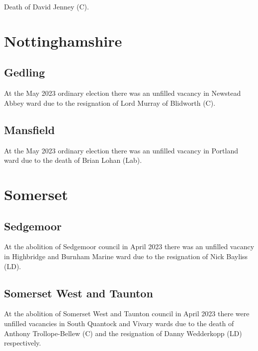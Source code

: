 \documentclass[a4paper,openany]{book}
\begin{document}
\begin{resultsiii}

Death of David Jenney (C).

\section{Nottinghamshire}

\subsection*{Gedling}

At the May 2023 ordinary election there was an unfilled vacancy in Newstead Abbey ward due to the resignation of Lord Murray of Blidworth (C).%

\subsection*{Mansfield}

At the May 2023 ordinary election there was an unfilled vacancy in Portland ward due to the death of Brian Lohan (Lab).%

\section{Somerset}

\subsection*{Sedgemoor}

At the abolition of Sedgemoor council in April 2023 there was an unfilled vacancy in Highbridge and Burnham Marine ward due to the resignation of Nick Bayliss (LD).%

\subsection*{Somerset West and Taunton}

At the abolition of Somerset West and Taunton council in April 2023 there were unfilled vacancies in South Quantock and Vivary wards due to the death of Anthony Trollope-Bellew (C) and the resignation of Danny Wedderkopp (LD) respectively.%
%


\end{resultsiii}
\end{document}

